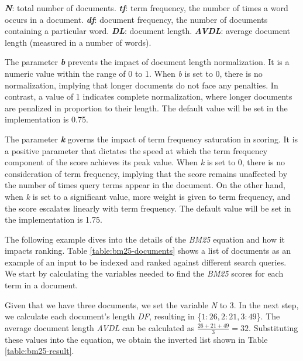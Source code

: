 \textit{\textbf{N}}: total number of documents. \textit{\textbf{tf}}: term frequency, the number of times a word occurs in a document. \textit{\textbf{df}}: document frequency, the number of documents containing a particular word. \textit{\textbf{DL}}: document length. \textit{\textbf{AVDL}}: average document length (measured in a number of words).

The parameter \textbf{\textit{b}} prevents the impact of document length normalization. It is a numeric value within the range of 0 to 1. When \textit{b} is set to 0, there is no normalization, implying that longer documents do not face any penalties. In contrast, a value of 1 indicates complete normalization, where longer documents are penalized in proportion to their length. The default value will be set in the implementation is 0.75.

The parameter \textbf{\textit{k}} governs the impact of term frequency saturation in scoring. It is a positive parameter that dictates the speed at which the term frequency component of the score achieves its peak value. When \textit{k} is set to 0, there is no consideration of term frequency, implying that the score remains unaffected by the number of times query terms appear in the document. On the other hand, when \textit{k} is set to a significant value, more weight is given to term frequency, and the score escalates linearly with term frequency. The default value will be set in the implementation is 1.75.

The following example dives into the details of the \textit{BM25} equation and how it impacts ranking. Table \ref{table:bm25-documents} shows a list of documents as an example of an input to be indexed and ranked against different search queries. We start by calculating the variables needed to find the \textit{BM25} scores for each term in a document.    

Given that we have three documents, we set the variable \textit{N} to 3. In the next step, we calculate each document's length \textit{DF}, resulting in \{$1: 26, 2: 21, 3: 49$\}. The average document length \textit{AVDL} can be calculated as $\frac{26 + 21 + 49}{3} = 32$. Substituting these values into the equation, we obtain the inverted list shown in Table \ref{table:bm25-result}.

